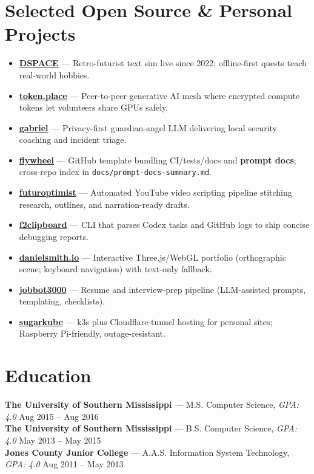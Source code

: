 \documentclass[10pt]{article}
\begin{document}
\vspace{-2mm}
\section*{Selected Open Source \& Personal Projects}
\begin{itemize}
  \item \textbf{\href{https://github.com/democratizedspace/dspace/tree/v3}{DSPACE}} — Retro-futurist text sim
live since 2022; offline-first quests teach real-world hobbies.
  \item \textbf{\href{https://token.place}{token.place}} — Peer-to-peer generative AI mesh where
encrypted compute tokens let volunteers share GPUs safely.
  \item \textbf{\href{https://github.com/futuroptimist/gabriel}{gabriel}} — Privacy-first guardian-angel
LLM delivering local security coaching and incident triage.
  \item \textbf{\href{https://github.com/futuroptimist/flywheel}{flywheel}} — GitHub template bundling
CI/tests/docs and \textbf{prompt docs}; cross-repo index in \texttt{docs/prompt-docs-summary.md}.
  \item \textbf{\href{https://github.com/futuroptimist/futuroptimist}{futuroptimist}} — Automated
YouTube video scripting pipeline stitching research, outlines, and narration-ready drafts.
  \item \textbf{\href{https://github.com/futuroptimist/f2clipboard}{f2clipboard}} — CLI that parses Codex
tasks and GitHub logs to ship concise debugging reports.
  \item \textbf{\href{https://github.com/futuroptimist/danielsmith.io}{danielsmith.io}} — Interactive
Three.js/WebGL portfolio (orthographic scene; keyboard navigation) with text-only fallback.
  \item \textbf{\href{https://github.com/futuroptimist/jobbot3000}{jobbot3000}} — Resume and interview-prep
pipeline (LLM-assisted prompts, templating, checklists).
  \item \textbf{\href{https://github.com/futuroptimist/sugarkube}{sugarkube}} — k3s plus Cloudflare-tunnel
hosting for personal sites; Raspberry Pi-friendly, outage-resistant.
\end{itemize}

\vspace{-2mm}
\section*{Education}
\textbf{The University of Southern Mississippi} — M.S. Computer Science, \textit{GPA: 4.0} \hfill Aug 2015 -- Aug 2016 \\
\textbf{The University of Southern Mississippi} — B.S. Computer Science, \textit{GPA: 4.0} \hfill May 2013 -- May 2015 \\
\textbf{Jones County Junior College} — A.A.S. Information System Technology, \textit{GPA: 4.0} \hfill Aug 2011 -- May 2013
\end{document}
